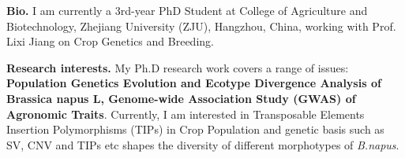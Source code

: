 %
%

\par{
{\textbf{Bio.}} 
I am currently a 3rd-year PhD Student at College of Agriculture and Biotechnology, Zhejiang University (ZJU), Hangzhou, China, 
 working with Prof. Lixi Jiang on Crop Genetics and Breeding. 

{\textbf{Research interests.}} 
My Ph.D research work covers a range of issues: \textbf{Population Genetics Evolution and Ecotype Divergence Analysis of Brassica napus L, 
Genome-wide Association Study (GWAS) of Agronomic Traits}. Currently, I am interested in Transposable Elements Insertion Polymorphisms (TIPs) in Crop Population and genetic basis such as SV, CNV and TIPs etc shapes the diversity of different morphotypes of \emph{B.napus}.  
}